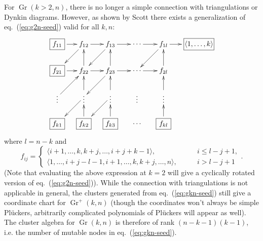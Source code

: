 \documentclass[11pt]{article}
\DeclareMathOperator{\Gr}{Gr}
\def\ket#1{\langle #1 \rangle}
\begin{document}
For $\Gr(k>2,n)$, there is no longer a simple connection with triangulations or Dynkin diagrams. However, as shown by Scott \cite{1088.22009} there exists a generalization of eq.~(\ref{eq:g2n-seed}) valid for all $k,n$:
\begin{equation}\label{eq:gkn-seed}
\begin{gathered}
\begin{xy} 0;<-.5pt,0pt>:<0pt,-.5pt>::
	(-100,0) *+{\framebox[10ex]{$\ket{1,\ldots,k}$}} ="-1",
	(0,0) *+{f_{1l}} ="0",
	(75,0) *+{\cdots} ="1",
	(150,0) *+{f_{13}} ="2",
	(225,0) *+{f_{12}} ="3",
	(300,0) *+{\framebox[5ex]{$f_{11}$}} ="4",
	(0,75) *+{f_{2l}} ="5",
	(75,75) *+{\cdots} ="6",
	(150,75) *+{f_{23}} ="7",
	(225,75) *+{f_{22}} ="8",
	(300,75) *+{\framebox[5ex]{$f_{21}$}} ="9",
	(0,150) *+{\vdots} ="10",
	(75,150) *+{\vdots} ="11",
	(150,150) *+{\vdots} ="12",
	(225,150) *+{\vdots} ="13",
	(300,150) *+{\vdots} ="14",
	(0,225) *+{\framebox[5ex]{$f_{kl}$}} ="15",
	(75,225) *+{\cdots} ="16",
	(150,225) *+{\framebox[5ex]{$f_{k3}$}} ="17",
	(225,225) *+{\framebox[5ex]{$f_{k2}$}} ="18",
	(300,225) *+{\framebox[5ex]{$f_{k1}$}} ="19",
	(-60,0) *+{} ="20",
	"0", {\ar"-1"},
	"1", {\ar"0"},
	"5", {\ar"0"},
	"0", {\ar"6"},
	"2", {\ar"1"},
	"3", {\ar"2"},
	"7", {\ar"2"},
	"2", {\ar"8"},
	"4", {\ar"3"},
	"8", {\ar"3"},
	"3", {\ar"9"},
	"6", {\ar"5"},
	"7", {\ar"6"},
	"8", {\ar"7"},
	"9", {\ar"8"},
	"7", {\ar"13"},
	"12", {\ar"7"},
	"13", {\ar"8"},
	"10", {\ar"5"},
	"14", {\ar"8"},
	"15", {\ar"10"},
	"17", {\ar"12"},
	"13", {\ar"19"},
	"12", {\ar"18"},
	"18", {\ar"13"},
\end{xy}
\end{gathered}
\end{equation}
where $l=n-k$ and 
\begin{equation}
  f_{i j} =
  \begin{cases}
    \langle i+1, \dotsc, k, k+j, \dotsc, i+j+k-1\rangle, \qquad &i \leq l-j+1,\\
    \langle 1, \dotsc, i+j-l-1, i+1, \dotsc, k, k+j, \dotsc, n\rangle, \qquad &i >l-j+1
  \end{cases}.
\end{equation}
(Note that evaluating the above expression at $k=2$ will give a cyclically rotated version of eq.~(\ref{eq:g2n-seed})). While the connection with triangulations is not applicable in general, the clusters generated from eq.~(\ref{eq:gkn-seed}) still give a coordinate chart for $\Gr^+(k,n)$ (though the coordinates won't always be simple Pl\"uckers, arbitrarily complicated polynomials of Pl\"uckers will appear as well). The cluster algebra for $\Gr(k,n)$ is therefore of rank $(n-k-1)(k-1)$, i.e. the number of mutable nodes in eq.~(\ref{eq:gkn-seed}). 
\end{document}
